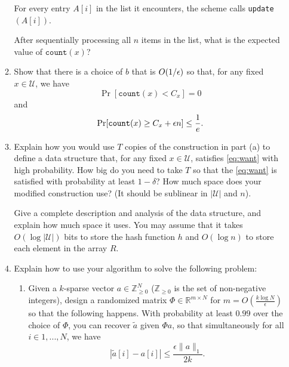 \begin{enumerate}
\begin{enumerate}
For every entry $A[i]$ in the list it encounters, the scheme calls \texttt{update}$(A[i])$. 

After sequentially processing all $n$ items in the list, what is the expected value of $\texttt{count}(x)$?

\item {} Show that there is a choice of $b$ that is $O(1/\epsilon)$ so that, 
for any fixed $x \in \mathcal{U}$, 
we have
\[ \Pr[ \texttt{count}(x) < C_x ] = 0 \]
and 
\[ \Pr[\texttt{count}(x) \geq C_x + \epsilon n] \leq \frac{1}{e}.\]


\item {} Explain how you would use $T$ copies of the construction in part (a) to define a data structure that, for any fixed $x \in \mathcal{U}$, satisfies \eqref{eq:want} with high probability.  How big do you need to take $T$ so that the \eqref{eq:want} is satisfied with probability at least $1 - \delta$?
How much space does your modified construction use?  (It should be sublinear in $|\mathcal{U}|$ and $n$).

Give a complete description and analysis of the data structure, and explain how much space it uses.  You may assume that it takes $O(\log|\mathcal{U}|)$ bits to store the hash function $h$ and $O(\log n)$ to store each element in the array $R$.

\item Explain how to use your algorithm to solve the following problem:
\begin{enumerate}
\item {}  Given a $k$-sparse vector $a \in \mathbb{Z}_{\geq 0}^N$ ($\mathbb{Z}_{\geq 0}$ is the set of non-negative integers), design a randomized matrix $\Phi \in \mathbb{R}^{m \times N}$ for $m = O( \frac{k \log N}{\epsilon} )$ so that the following happens. With probability at least $0.99$ over the choice of $\Phi$, you can recover $\tilde{a}$ given $\Phi a$, so that simultaneously for all $i \in 1, ..., N$, we have
\[|\tilde{a}[i] - a[i]| \leq \frac{\epsilon \|a\|_1}{2k}.\]




\end{enumerate}
\end{enumerate}
\end{enumerate}
